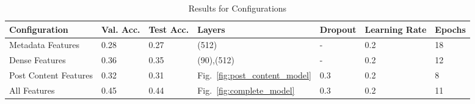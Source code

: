 \documentclass[acmsmall]{acmart}
\begin{document}
\begin{table}[H]
\begin{tabular}{lllllll}
Configuration & Val. Acc. & Test Acc. & Layers & Dropout & Learning Rate & Epochs\\ \hline
Metadata Features & 0.28 & 0.27 & (512) &  - & 0.2 & 18 \\
Dense Features & 0.36 & 0.35 & (90),(512) & - & 0.2 & 12 \\
Post Content Features & 0.32 & 0.31 & Fig.~\ref{fig:post_content_model} & 0.3 & 0.2 & 8 \\
All Features & 0.45 & 0.44 & Fig.~\ref{fig:complete_model} & 0.3 & 0.2 & 11 \\
\end{tabular}
\caption{Results for Configurations}
\label{tab:result_configurations}
\end{table}
\end{document}

